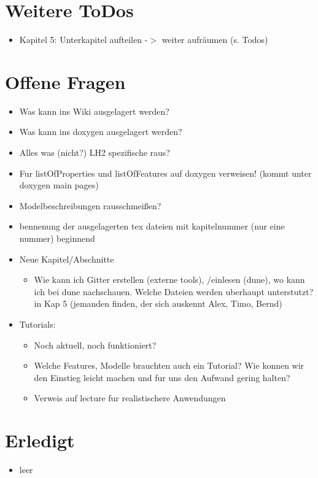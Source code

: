 \section*{Weitere ToDos}
\begin{itemize}
  \item Kapitel 5: Unterkapitel aufteilen -$>$ weiter aufräumen (s. Todos)
\end{itemize}

\section*{Offene Fragen}
\begin{itemize}
  \item Was kann ins Wiki ausgelagert werden?
  \item Was kann ins doxygen ausgelagert werden?
  \item Alles was (nicht?) LH2 spezifische raus?
  \item Fur listOfProperties und listOfFeatures auf doxygen verweisen! (kommt
        unter doxygen main pages)
  \item Modelbeschreibungen rausschmeißen?
  \item bennenung der ausgelagerten tex dateien mit kapitelnummer (nur eine nummer)
        beginnend
  \item Neue Kapitel/Abschnitte
  \begin{itemize}
    \item Wie kann ich Gitter erstellen (externe tools), /einlesen (dune), wo
          kann ich bei dune nachschauen. Welche Dateien werden uberhaupt unterstutzt?
          in Kap 5 (jemanden finden, der sich auskennt Alex, Timo, Bernd)
  \end{itemize}
  \item Tutorials:
  \begin{itemize}
    \item Noch aktuell, noch funktioniert?
    \item Welche Features, Modelle brauchten auch ein Tutorial? Wie konnen wir
          den Einstieg leicht machen und fur uns den Aufwand gering halten?
    \item Verweis auf lecture fur realistischere Anwendungen
  \end{itemize}
\end{itemize}

\section*{Erledigt}
\begin{itemize}
  \item leer
\end{itemize}
